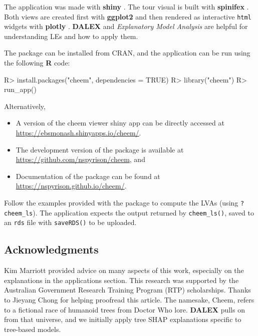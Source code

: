 \documentclass[
]{sn-jnl}
\providecommand{\tightlist}{%
  \setlength{\itemsep}{0pt}\setlength{\parskip}{0pt}}
\begin{document}
The application was made with \textbf{shiny} \citep{chang_shiny_2021}.
The tour visual is built with \textbf{spinifex}
\citep{spyrison_spinifex_2020}. Both views are created first with
\textbf{ggplot2} \citep{wickham_ggplot2_2016} and then rendered as
interactive \texttt{html} widgets with \textbf{plotly}
\citep{sievert_interactive_2020}. \textbf{DALEX}
\citep{biecek_dalex_2018} and \emph{Explanatory Model Analysis}
\citep{biecek_explanatory_2021} are helpful for understanding LEs and
how to apply them.

The package can be installed from CRAN, and the application can be run
using the following \textbf{R} code:

\begin{CodeChunk}
\begin{CodeInput}
R> install.packages("cheem", dependencies = TRUE)
R> library("cheem")
R> run_app()
\end{CodeInput}
\end{CodeChunk}

Alternatively,

\begin{itemize}
\tightlist
\item
  A version of the cheem viewer shiny app can be directly accessed at
  \url{https://ebsmonash.shinyapps.io/cheem/}.
\item
  The development version of the package is available at
  \url{https://github.com/nspyrison/cheem}, and
\item
  Documentation of the package can be found at
  \url{https://nspyrison.github.io/cheem/}.
\end{itemize}

Follow the examples provided with the package to compute the LVAs (using
\texttt{?cheem\_ls}). The application expects the output returned by
\texttt{cheem\_ls()}, saved to an \texttt{rds} file with
\texttt{saveRDS()} to be uploaded.

\hypertarget{acknowledgments}{%
\subsection*{Acknowledgments}\label{acknowledgments}}

Kim Marriott provided advice on many aspects of this work, especially on
the explanations in the applications section. This research was
supported by the Australian Government Research Training Program (RTP)
scholarships. Thanks to Jieyang Chong for helping proofread this
article. The namesake, Cheem, refers to a fictional race of humanoid
trees from Doctor Who lore. \textbf{DALEX} pulls on from that universe,
and we initially apply tree SHAP explanations specific to tree-based
models.

\renewcommand\refname{References}

\end{document}

